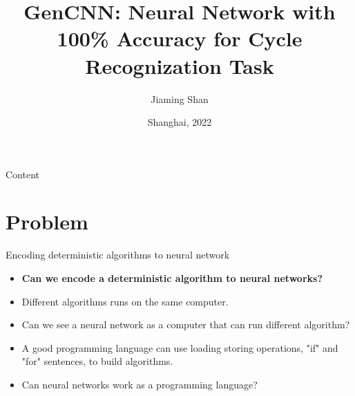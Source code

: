 \documentclass[serif]{beamer}
\begin{document}
\title[title]{GenCNN: Neural Network with 100\% Accuracy for Cycle Recognization Task}

\author[]{Jiaming Shan} %


\date[Date below]{Shanghai, 2022} %


\begin{frame}

	\thispagestyle{empty}%

	\titlepage

\end{frame}


\begin{frame}{Content}

	\tableofcontents %

\end{frame}


\section{Problem}

\begin{frame}{Encoding deterministic algorithms to neural network}


    

    \begin{itemize}

        \item \textbf{Can we encode a deterministic algorithm to neural networks?}

		\item Different algorithms runs on the same computer.

		\item Can we see a neural network as a computer that can run different algorithm?

		\item A good programming language can use loading storing operations, "if" and "for" sentences, to build algorithms.

        \item Can neural networks work as a programming language?

	\end{itemize}

    

    

    

    
    

\end{frame}
\end{document}
